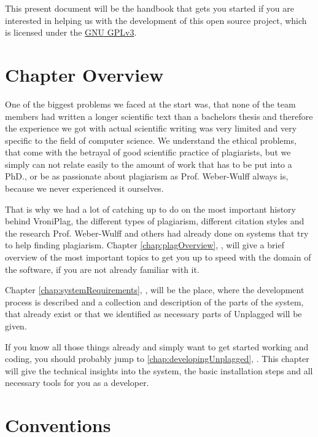 This present document will be the handbook that gets you started if you are interested in helping us with the development of this 
open source project, which is licensed under the \href{http://www.gnu.org/licenses/quick-guide-gplv3}{GNU GPLv3}.

\section*{Chapter Overview}

One of the biggest problems we faced at the start was, that none of the team members had written a longer scientific
text than a bachelors
thesis and therefore the experience we got with actual scientific writing was very limited and very specific to the 
field of computer science. We understand the ethical problems, that come with the betrayal of 
good scientific practice of plagiarists, but we simply can not relate easily to the amount of work that has to be put into 
a PhD., or be as 
passionate about plagiarism as Prof. Weber-Wulff always is, because we never experienced it ourselves.

That is why we had a lot of catching up to do on the most important history behind VroniPlag, the different types
of plagiarism, different citation styles and the research Prof. Weber-Wulff and others had already done on systems that try to 
help finding plagiarism. Chapter \ref{chap:plagOverview}, , will
give a brief overview of the most important topics to get you up to speed with the domain of the software, if you are
not already familiar with it.

Chapter \ref{chap:systemRequirements}, , will be the place, where the development process is described and a collection and description 
of the parts of the system, that already exist or that we identified as 
necessary parts of Unplagged will be given.

If you know all those things already and simply want to get started working and coding, you should probably jump
to \ref{chap:developingUnplagged}, . This chapter will give the technical insights into 
the system, the basic installation
steps and all necessary tools for you as a developer.


\section*{Conventions}

